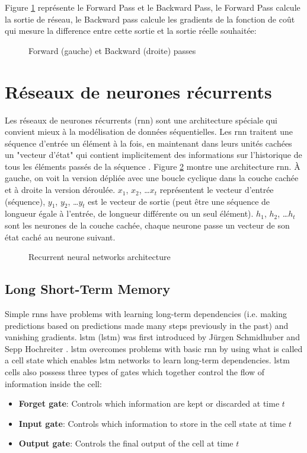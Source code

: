 Figure \ref{fig:forward-backward-pass} représente le Forward Pass et le Backward Pass, le Forward Pass calcule la sortie de réseau, le Backward pass calcule les gradients de la fonction de coût qui mesure la difference entre cette sortie et la sortie réelle souhaitée:

\begin{figure}[h]
    \centering
	
    \caption{Forward (gauche) et Backward (droite) passes}
    \label{fig:forward-backward-pass}
\end{figure}


\section{Réseaux de neurones récurrents}
Les réseaux de neurones récurrents (\acrshort{rnn}) sont une architecture spéciale qui convient mieux à la modélisation de données séquentielles. Les \acrshort{rnn} traitent une séquence d'entrée un élément à la fois, en maintenant dans leurs unités cachées un "vecteur d'état" qui contient implicitement des informations sur l'historique de tous les éléments passés de la séquence \cite{LeCun2015}. Figure \ref{fig:rnn} montre une architecture \acrshort{rnn}. À gauche, on voit la version dépliée avec une boucle cyclique dans la couche cachée et à droite la version déroulée. $x_1$, $x_2$, …$x_t$ représentent le vecteur d'entrée (séquence), $y_1$, $y_2$, …$y_t$ est le vecteur de sortie (peut être une séquence de longueur égale à l'entrée, de longueur différente ou un seul élément). $h_1$, $h_2$, …$h_t$ sont les neurones de la couche cachée, chaque neurone passe un vecteur de son état caché au neurone suivant.

\begin{figure}[H]
    \centering
    
    \caption{Recurrent neural networks architecture}
    \label{fig:rnn}
\end{figure}

\subsection{Long Short-Term Memory}
Simple \acrshort{rnn}s have problems with learning long-term dependencies (i.e. making predictions based on predictions made many steps previously in the past) and vanishing gradients. \acrlong{lstm} (\acrshort{lstm}) was first introduced by Jürgen Schmidhuber and Sepp Hochreiter \cite{Hochreiter1997}. \acrshort{lstm} overcomes problems with basic \acrshort{rnn} by using what is called a cell state which enables \acrshort{lstm} networks to learn long-term dependencies. \acrshort{lstm} cells also possess three types of gates which together control the flow of information inside the cell:
\begin{itemize}
    \item \textbf{Forget gate}: Controls which information are kept or discarded at time $t$
    \item \textbf{Input gate}: Controls which information to store in the cell state at time $t$
    \item \textbf{Output gate}: Controls the final output of the cell at time $t$
\end{itemize}

